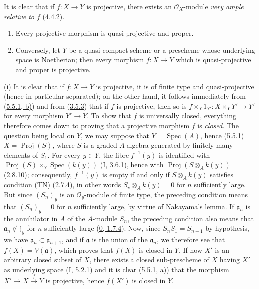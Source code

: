 It is clear that if $f:X\to Y$ is projective, there exists an
$\mathcal{O}_X$-module \emph{very ample relative to $f$}
(\hyperref[II.4.4.2]{4.4.2}).

\begin{theorem}[5.5.3]
\label{II.5.5.3}
\begin{enumerate}
  \item[\rm{(i)}] Every projective morphism is quasi-projective and proper.
  \item[\rm{(ii)}] Conversely, let $Y$ be a quasi-compact scheme or a
  prescheme whose underlying space is Noetherian; then every morphism
  $f:X\to Y$ which is quasi-projective and proper is projective.
\end{enumerate}
\end{theorem}

(i) It is clear that if $f:X\to Y$ is projective, it is of finite type and
quasi-projective (hence in particular separated); on the other hand, it
follows immediately from (\hyperref[II.5.5.1]{5.5.1, b)}) and from
(\hyperref[II.3.5.3]{3.5.3}) that if $f$ is projective, then so is
$f\times_Y1_{Y'}:X\times_YY'\to Y'$ for every morphism $Y'\to Y$. To show
that $f$ is universally closed, everything therefore comes down to proving
that a projective morphism $f$ is \emph{closed}. The question being local on
$Y$, we may suppose that $Y=\operatorname{Spec}(A)$, hence
(\hyperref[II.5.5.1]{5.5.1}) $X=\operatorname{Proj}(S)$, where $S$ is a
graded $A$-algebra generated by finitely many elements of $S_1$. For
every $y\in Y$, the fibre $f^{-1}(y)$ is identified with
$\operatorname{Proj}(S)\times_Y\operatorname{Spec}(k(y))$
(\hyperref[I.3.6.1]{I, 3.6.1}), hence with
$\operatorname{Proj}(S\otimes_Ak(y))$
(\hyperref[II.2.8.10]{2.8.10}); consequently, $f^{-1}(y)$ is empty if and
only if $S\otimes_Ak(y)$ satisfies condition (TN)
(\hyperref[II.2.7.4]{2.7.4}), in other words $S_n\otimes_Ak(y)=0$ for $n$
sufficiently large. But since $(S_n)_y$ is an $\mathcal{O}_y$-module of
finite type, the preceding condition means that $(S_n)_y=0$ for $n$
sufficiently large, by virtue of Nakayama's lemma. If $\mathfrak a_n$ is the
annihilator in $A$ of the $A$-module $S_n$, the preceding condition also
means that $\mathfrak a_n\not\subset\mathfrak j_y$ for $n$ sufficiently large
(\hyperref[0.1.7.4]{0, 1.7.4}). Now, since $S_nS_1=S_{n+1}$ by hypothesis,
we have $\mathfrak a_n\subset\mathfrak a_{n+1}$, and if $\mathfrak a$ is the
union of the $\mathfrak a_n$, we therefore see that $f(X)=V(\mathfrak a)$,
which proves that $f(X)$ is closed in $Y$. If now $X'$ is an arbitrary closed
subset of $X$, there exists a closed sub-prescheme of $X$ having $X'$
as underlying space (\hyperref[I.5.2.1]{I, 5.2.1}) and it is clear
(\hyperref[II.5.5.1]{5.5.1, a)}) that the morphism
$X'\to X\xrightarrow{f}Y$ is projective, hence $f(X')$ is closed in $Y$.

